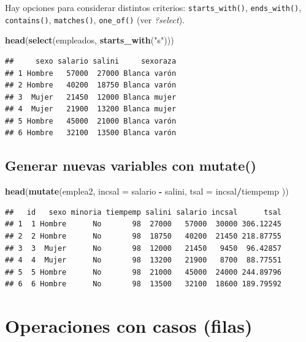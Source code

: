 \documentclass[]{book}
\newenvironment{Shaded}{\begin{snugshade}}{\end{snugshade}}
\newcommand{\KeywordTok}[1]{\textcolor[rgb]{0.13,0.29,0.53}{\textbf{#1}}}
\newcommand{\DataTypeTok}[1]{\textcolor[rgb]{0.13,0.29,0.53}{#1}}
\newcommand{\StringTok}[1]{\textcolor[rgb]{0.31,0.60,0.02}{#1}}
\newcommand{\OperatorTok}[1]{\textcolor[rgb]{0.81,0.36,0.00}{\textbf{#1}}}
\newcommand{\NormalTok}[1]{#1}
\begin{document}
Hay opciones para considerar distintos criterios:
\texttt{starts\_with()}, \texttt{ends\_with()}, \texttt{contains()},
\texttt{matches()}, \texttt{one\_of()} (ver \emph{?select}).

\begin{Shaded}
\begin{Highlighting}[]
\KeywordTok{head}\NormalTok{(}\KeywordTok{select}\NormalTok{(empleados, }\KeywordTok{starts_with}\NormalTok{(}\StringTok{"s"}\NormalTok{)))}
\end{Highlighting}
\end{Shaded}

\begin{verbatim}
##     sexo salario salini     sexoraza
## 1 Hombre   57000  27000 Blanca varón
## 2 Hombre   40200  18750 Blanca varón
## 3  Mujer   21450  12000 Blanca mujer
## 4  Mujer   21900  13200 Blanca mujer
## 5 Hombre   45000  21000 Blanca varón
## 6 Hombre   32100  13500 Blanca varón
\end{verbatim}

\subsection{\texorpdfstring{Generar nuevas variables con
\textbf{mutate()}}{Generar nuevas variables con mutate()}}\label{generar-nuevas-variables-con-mutate}

\begin{Shaded}
\begin{Highlighting}[]
\KeywordTok{head}\NormalTok{(}\KeywordTok{mutate}\NormalTok{(emplea2, }\DataTypeTok{incsal =}\NormalTok{ salario }\OperatorTok{-}\StringTok{ }\NormalTok{salini, }\DataTypeTok{tsal =}\NormalTok{ incsal}\OperatorTok{/}\NormalTok{tiempemp ))}
\end{Highlighting}
\end{Shaded}

\begin{verbatim}
##   id   sexo minoria tiempemp salini salario incsal      tsal
## 1  1 Hombre      No       98  27000   57000  30000 306.12245
## 2  2 Hombre      No       98  18750   40200  21450 218.87755
## 3  3  Mujer      No       98  12000   21450   9450  96.42857
## 4  4  Mujer      No       98  13200   21900   8700  88.77551
## 5  5 Hombre      No       98  21000   45000  24000 244.89796
## 6  6 Hombre      No       98  13500   32100  18600 189.79592
\end{verbatim}

\section{Operaciones con casos
(filas)}\label{operaciones-con-casos-filas}
\end{document}
